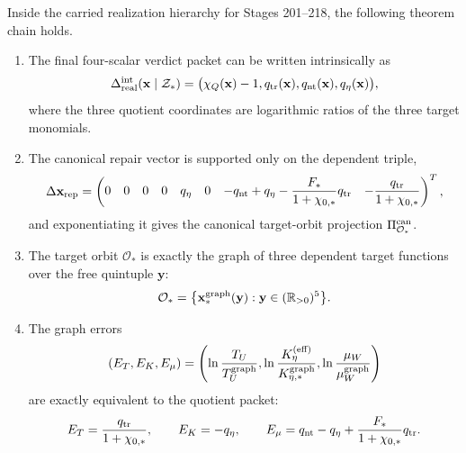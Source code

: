 \begin{theorem}
\label{thm:part06-main}
Inside the carried realization hierarchy for Stages 201--218, the following theorem chain holds.
\begin{enumerate}[leftmargin=2.2em]
  \item The final four-scalar verdict packet can be written intrinsically as
  \begin{equation}
  \label{eq:part06-main-intrinsic-packet}
  \Delta_{\rm real}^{\rm int}(\mathbf x\mid\mathcal Z_*)
  =
  \bigl(
  \chi_Q(\mathbf x)-1,
  q_{\rm tr}(\mathbf x),
  q_{\rm nt}(\mathbf x),
  q_\eta(\mathbf x)
  \bigr),
  \end{equation}
  where the three quotient coordinates are logarithmic ratios of the three target monomials.
  \item The canonical repair vector is supported only on the dependent triple,
  \begin{equation}
  \label{eq:part06-main-repair-vector}
  \Delta\mathbf x_{\rm rep}=
  \begin{pmatrix}
  0&0&0&0&q_\eta&0&-q_{\rm nt}+q_\eta-\dfrac{F_*}{1+\chi_{0,*}}q_{\rm tr}&-\dfrac{q_{\rm tr}}{1+\chi_{0,*}}
  \end{pmatrix}^{T},
  \end{equation}
  and exponentiating it gives the canonical target-orbit projection \(\Pi_{\mathcal O_*}^{\rm can}\).
  \item The target orbit \(\mathcal O_*\) is exactly the graph of three dependent target functions over the free quintuple \(\mathbf y\):
  \begin{equation}
  \label{eq:part06-main-target-graph}
  \mathcal O_*
  =
  \bigl\{\mathbf x_*^{\rm graph}(\mathbf y):\mathbf y\in(\mathbb R_{>0})^5\bigr\}.
  \end{equation}
  \item The graph errors
  \begin{equation}
  \label{eq:part06-main-graph-errors}
  (E_T,E_K,E_\mu)
  =
  \left(
  \ln\frac{T_U}{T_U^{\rm graph}},
  \ln\frac{K_\eta^{(\rm eff)}}{K_{\eta,*}^{\rm graph}},
  \ln\frac{\mu_W}{\mu_W^{\rm graph}}
  \right)
  \end{equation}
  are exactly equivalent to the quotient packet:
  \begin{equation}
  \label{eq:part06-main-graph-quotient}
  E_T=\frac{q_{\rm tr}}{1+\chi_{0,*}},
  \qquad
  E_K=-q_\eta,
  \qquad
  E_\mu=q_{\rm nt}-q_\eta+\frac{F_*}{1+\chi_{0,*}}q_{\rm tr}.
  \end{equation}

\end{enumerate}
\end{theorem}
